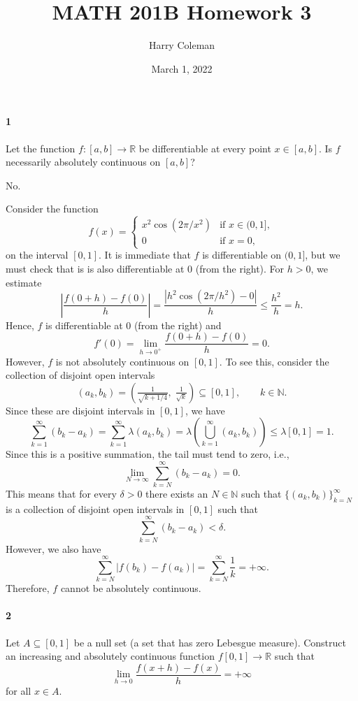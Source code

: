 \documentclass[12pt]{article}
\renewcommand{\maketitle}{\thispagestyle{title}}
\newlength{\myparskip}
\newenvironment{fullbox}{\begin{lrbox}{\savefullbox}\begin{minipage}{\dimexpr\textwidth-2\fboxsep\relax}\setlength{\parskip}{\myparskip}}{\end{minipage}\end{lrbox}\framebox[\textwidth]{\usebox{\savefullbox}}}
\newenvironment{pbox}[1][]{\begin{fullbox}\ifx#1\empty\else\paragraph{#1}\phantom{}\fi}{\end{fullbox}}
\theoremstyle{definition}
\newcommand{\N}{\mathbb{N}}
\newcommand{\R}{\mathbb{R}}
\newcommand{\<}{\langle}
\renewcommand{\>}{\rangle}
\newcommand{\seq}{\subseteq}
\begin{document}
\title{MATH 201B Homework 3}
\author{Harry Coleman}
\date{March 1, 2022}
\maketitle

\begin{pbox}[1]
    Let the function $f : [a, b] \to \R$ be differentiable at every point $x \in [a, b]$.
    Is $f$ necessarily absolutely continuous on $[a, b]$?
\end{pbox}

No.

Consider the function
\[
    f(x) = \begin{cases}
        x^2 \cos(2\pi/x^2) &\text{if } x \in (0, 1], \\
        0 &\text{if } x = 0,
    \end{cases}
\]
on the interval $[0, 1]$.
It is immediate that $f$ is differentiable on $(0, 1]$, but we must check that is is also differentiable at $0$ (from the right).
For $h > 0$, we estimate
\[
    \left|\frac{f(0 + h) - f(0)}{h}\right|
        = \frac{|h^2\cos(2\pi/h^2) - 0|}{h}
        \leq \frac{h^2}{h}
        = h.
\]
Hence, $f$ is differentiable at $0$ (from the right) and
\[
    f'(0) = \lim_{h \to 0^+} \frac{f(0 + h) - f(0)}{h} = 0.
\]
However, $f$ is not absolutely continuous on $[0, 1]$.
To see this, consider the collection of disjoint open intervals
\[
    (a_k, b_k) = \left(\tfrac{1}{\sqrt{k + 1/4}},\; \tfrac{1}{\sqrt{k}}\right) \seq [0, 1], \qquad k \in \N.
\]
Since these are disjoint intervals in $[0, 1]$, we have
\[
    \sum_{k=1}^{\infty} (b_k - a_k) 
        = \sum_{k=1}^{\infty} \lambda(a_k, b_k)
        = \lambda\left(\bigcup_{k=1}^{\infty}(a_k, b_k)\right)
        \leq \lambda[0, 1]
        = 1. 
\]
Since this is a positive summation, the tail must tend to zero, i.e.,
\[
    \lim_{N \to \infty} \sum_{k=N}^{\infty} (b_k - a_k) = 0. 
\]
This means that for every $\delta > 0$ there exists an $N \in \N$ such that $\{(a_k, b_k)\}_{k=N}^{\infty}$ is a collection of disjoint open intervals in $[0, 1]$ such that
\[
    \sum_{k=N}^{\infty} (b_k - a_k) < \delta.
\]
However, we also have
\[
    \sum_{k=N}^{\infty} |f(b_k) - f(a_k)|
        = \sum_{k=N}^{\infty} \frac{1}{k}
        = +\infty.
\]
Therefore, $f$ cannot be absolutely continuous.



\begin{pbox}[2]
    Let $A \seq [0, 1]$ be a null set (a set that has zero Lebesgue measure).
    Construct an increasing and absolutely continuous function $f [0, 1] \to \R$ such that
    \[
        \lim_{h \to 0} \frac{f(x + h) - f(x)}{h} = + \infty
    \]
    for all $x \in A$.
\end{pbox}
\end{document}
